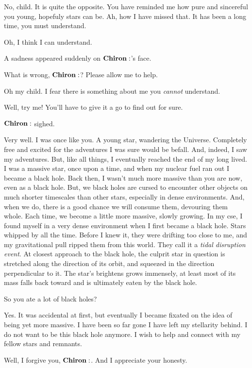 \Chiron No, child.  It is quite the opposite.  You have reminded me how pure and sincereful you young, hopefuly stars can be.  Ah, how I have missed that.  It has been a long time, you must understand.  

\Electra Oh, I think I can understand.

A sadness appeared suddenly on $\Chiron$'s face.

\Electra What is wrong, $\Chiron$?  Please allow me to help.

\Chiron Oh my child.  I fear there is something about me you \textit{cannot} understand.

\Electra Well, try me!  You'll have to give it a go to find out for sure.

$\Chiron$ sighed.

\Chiron Very well.  I was once like you.  A young star, wandering the Universe.  Completely free and excited for the adventures I was sure would be befall.  And, indeed, I saw my adventures.  But, like all things, I eventually reached the end of my long lived.  I was a massive star, once upon a time, and when my nuclear fuel ran out I became a black hole.  Back then, I wasn't much more massive than you are now, even as a black hole.  But, we black holes are cursed to encounter other objects on much shorter timescales than other stars, especially in dense environments.  And, when we do, there is a good chance we will consume them, devouring them whole.  Each time, we become a little more massive, slowly growing.  In my cse, I found myself in a very dense environment when I first became a black hole.  Stars whipped by all the time.  Before I knew it, they were drifting too close to me, and my gravitational pull ripped them from this world.  They call it a \textit{tidal disruption event}.  At closest approach to the black hole, the culprit star in question is stretched along the direction of its orbit, and squeezed in the direction perpendicular to it.  The star's brightens grows immensely, at least most of its mass falls back toward and is ultimately eaten by the black hole.  

\Electra So you ate a lot of black holes?

\Chiron Yes.  It was accidental at first, but eventually I became fixated on the idea of being yet more massive.  I have been so far gone I have left my stellarity behind.  I do not want to be this black hole anymore.  I wish to help and connect with my fellow stars and remnants.  

\Electra Well, I forgive you, $\Chiron$.  And I appreciate your honesty.

